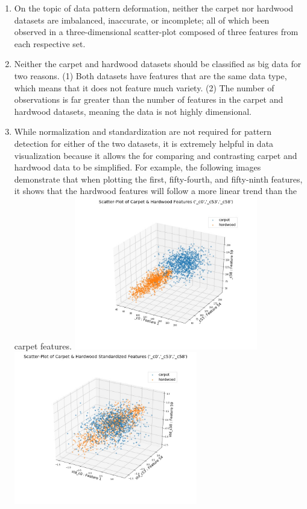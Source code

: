 \documentclass[a4paper,12pt]{IEEEtran}
\begin{document}
\begin{enumerate}
\item On the topic of data pattern deformation, neither the carpet nor hardwood datasets are imbalanced, inaccurate, or incomplete; all of which been observed in a three-dimensional scatter-plot composed of three features from each respective set.
\item Neither the carpet and hardwood datasets should be classified as big data for two reasons. (1) Both datasets have features that are the same data type, which means that it does not feature much variety. (2) The number of observations is far greater than the number of features in the carpet and hardwood datasets, meaning the data is not highly dimensional.
\item While normalization and standardization are not required for pattern detection for either of the two datasets, it is extremely helpful in data visualization because it allows the for comparing and contrasting carpet and hardwood data to be simplified. For example, the following images demonstrate that when plotting the first, fifty-fourth, and fifty-ninth features, it shows that the hardwood features will follow a more linear trend than the carpet features.
\includegraphics[width=8cm]{carpethardwood_3d01}
\includegraphics[width=8cm]{carpethardwood_3d02}
\end{enumerate}
\end{document}

